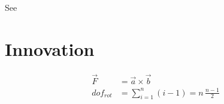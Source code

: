 See \cite{KJ:2016}




\section{Innovation} %
\label{sec:innovation}

\lipsum[2]

\begin{align}
  \vec F &= \vec a \times \vec b\\
  {dof}_{rot} &= \sum_{i=1}^n (i-1) = n\, \frac{n-1}{2}
\end{align}

\lipsum[7-13]
\lipsum[14-20]

